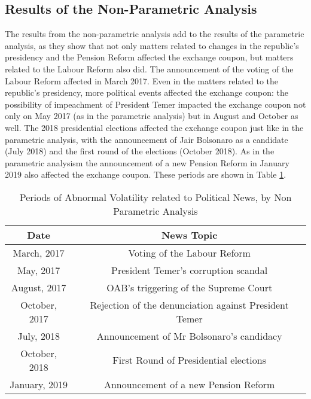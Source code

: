 \documentclass[cic,tc, english]{iiufrgs}
\begin{document}
\subsection{Results of the Non-Parametric Analysis}

    The results from the non-parametric analysis add to the results of the parametric analysis, as they show that not only matters related to changes in the republic's presidency and the Pension Reform affected the exchange coupon, but matters related to the Labour Reform also did. The announcement of the voting of the Labour Reform affected in March 2017. Even in the matters related to the republic's presidency, more political events affected the exchange coupon: the possibility of impeachment of President Temer impacted the exchange coupon not only on May 2017 (as in the parametric analysis) but in August and October as well. The 2018 presidential elections affected the exchange coupon just like in the parametric analysis, with the announcement of Jair Bolsonaro as a candidate (July 2018) and the first round of the elections (October 2018). As in the parametric analysism the announcement of a new Pension Reform in January 2019 also affected the exchange coupon. These periods are shown in Table \ref{tab:resnon}.

    \begin{table}[H]
        \caption{Periods of Abnormal Volatility related to Political News, by Non Parametric Analysis}
        \label{tab:resnon}
        \centering
        \begin{tabular}{ | c | c | }
            \hline
            Date & News Topic \\
            \hline \hline
            March, 2017 & Voting of the Labour Reform \\
            \hline
            May, 2017 & President Temer's corruption scandal \\
            \hline
            August, 2017 & OAB's triggering of the Supreme Court \\
            \hline
            October, 2017 & Rejection of the denunciation against President Temer \\
            \hline
            July, 2018 & Announcement of Mr Bolsonaro's candidacy \\
            \hline
            October, 2018 & First Round of Presidential elections \\
            \hline
            January, 2019 & Announcement of a new Pension Reform \\
            \hline
        \end{tabular}
    \end{table}
\end{document}
